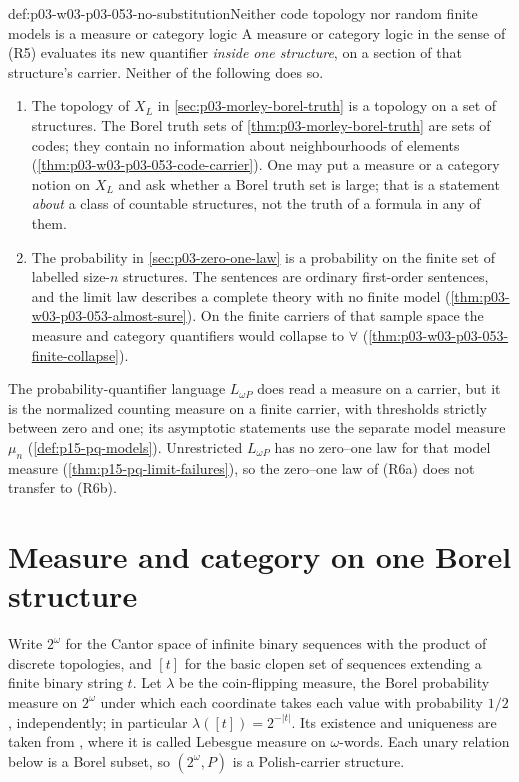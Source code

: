\begin{hbwarning}{def:p03-w03-p03-053-no-substitution}{Neither code topology nor random finite models is a measure or category logic}
A measure or category logic in the sense of (R5) evaluates its new
quantifier \emph{inside one structure}, on a section of that
structure's carrier. Neither of the following does so.
\begin{enumerate}
\item The topology of \(X_L\) in \cref{sec:p03-morley-borel-truth}
  is a topology on a set of structures. The Borel truth sets of
  \cref{thm:p03-morley-borel-truth} are sets of codes; they contain
  no information about neighbourhoods of elements
  (\cref{thm:p03-w03-p03-053-code-carrier}). One may put a measure or a
  category notion on \(X_L\) and ask whether a Borel truth set is
  large; that is a statement \emph{about} a class of countable
  structures, not the truth of a formula in any of them.
\item The probability in \cref{sec:p03-zero-one-law} is a probability on
  the finite set of labelled size-\(n\) structures. The sentences are
  ordinary first-order sentences, and the limit law describes a
  complete theory with no finite model
  (\cref{thm:p03-w03-p03-053-almost-sure}).
  On the finite carriers of that sample space the measure and category
  quantifiers would collapse to \(\forall\)
  (\cref{thm:p03-w03-p03-053-finite-collapse}).
\end{enumerate}
The probability-quantifier language \(L_{\omega P}\) does read a measure
on a carrier, but it is the normalized counting measure on a finite
carrier, with thresholds strictly between zero and one; its asymptotic
statements use the separate model measure \(\mu_n\)
(\cref{def:p15-pq-models}). Unrestricted \(L_{\omega P}\) has no
zero--one law for that model measure (\cref{thm:p15-pq-limit-failures}),
so the zero--one law of (R6a) does not transfer to (R6b).
\end{hbwarning}

\section{Measure and category on one Borel structure}
\label{sec:p03-w03-p03-053-measure-category}

Write \(2^\omega\) for the Cantor space of infinite binary sequences
with the product of discrete topologies, and \([t]\) for the basic
clopen set of sequences extending a finite binary string \(t\).
Let \(\lambda\) be the coin-flipping measure, the Borel probability
measure on \(2^\omega\) under which each coordinate takes each value
with probability \(1/2\), independently; in particular
\(\lambda([t])=2^{-|t|}\). Its existence and uniqueness are taken from
\cite[\S2.3, p.~6]{MioSkrzypczakMichalewski2018}, where it is called
Lebesgue measure on \(\omega\)-words. Each unary relation below is a
Borel subset, so \((2^\omega,P)\) is a Polish-carrier structure.

